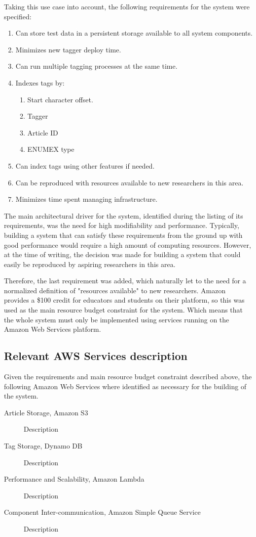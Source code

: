 Taking this use case into account, the following requirements for the system were specified:
\begin{enumerate}
\item Can store test data in a persistent storage available to all system components.
\item Minimizes new tagger deploy time.
\item Can run multiple tagging processes at the same time.
\item Indexes tags by:
  \begin{enumerate}
  \item Start character offset.
  \item Tagger
  \item Article ID
  \item ENUMEX type
  \end{enumerate}
\item Can index tags using other features if needed.
\item Can be reproduced with resources available to new researchers in this area.
\item Minimizes time spent managing infrastructure.
\end{enumerate}

The main architectural driver for the system, identified during the listing of its requirements, was the need for high modifiability and performance.
Typically, building a system that can satisfy these requirements from the ground up with good performance would require a high amount of computing resources. 
However, at the time of writing, the decision was made for building a system that could easily be reproduced by aspiring researchers in this area.

Therefore, the last requirement was added, which naturally let to the need for a normalized definition of "resources available" to new researchers.
Amazon provides a \$100 credit for educators and students on their platform, so this was used as the main resource budget constraint for the system.
Which means that the whole system must only be implemented using services running on the Amazon Web Services platform.

\subsection{Relevant AWS Services description}
Given the requirements and main resource budget constraint described above, the following Amazon Web Services where identified as necessary for the building of the system.
\begin{description}
\item[Article Storage, Amazon S3] Description
\item[Tag Storage, Dynamo DB] Description
\item[Performance and Scalability, Amazon Lambda] Description
\item[Component Inter-communication, Amazon Simple Queue Service] Description
\end{description}


